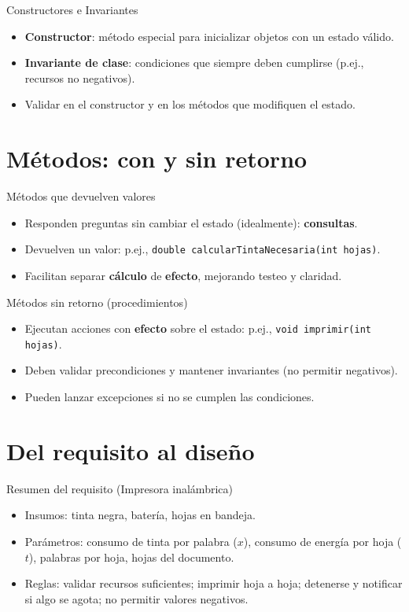\documentclass[aspectratio=169]{beamer}
\begin{document}
\begin{frame}{Constructores e Invariantes}
  \begin{itemize}
    \item \textbf{Constructor}: método especial para inicializar objetos con un estado válido.
    \item \textbf{Invariante de clase}: condiciones que siempre deben cumplirse (p.ej., recursos no negativos).
    \item Validar en el constructor y en los métodos que modifiquen el estado.
  \end{itemize}
\end{frame}

\section{Métodos: con y sin retorno}

\begin{frame}{Métodos que devuelven valores}
  \begin{itemize}
    \item Responden preguntas sin cambiar el estado (idealmente): \textbf{consultas}.
    \item Devuelven un valor: p.ej., \texttt{double calcularTintaNecesaria(int hojas)}.
    \item Facilitan separar \textbf{cálculo} de \textbf{efecto}, mejorando testeo y claridad.
  \end{itemize}
\end{frame}

\begin{frame}{Métodos sin retorno (procedimientos)}
  \begin{itemize}
    \item Ejecutan acciones con \textbf{efecto} sobre el estado: p.ej., \texttt{void imprimir(int hojas)}.
    \item Deben validar precondiciones y mantener invariantes (no permitir negativos).
    \item Pueden lanzar excepciones si no se cumplen las condiciones.
  \end{itemize}
\end{frame}

\section{Del requisito al diseño}

\begin{frame}{Resumen del requisito (Impresora inalámbrica)}
  \begin{itemize}
    \item Insumos: tinta negra, batería, hojas en bandeja.
    \item Parámetros: consumo de tinta por palabra (\(x\)), consumo de energía por hoja (\(t\)), palabras por hoja, hojas del documento.
    \item Reglas: validar recursos suficientes; imprimir hoja a hoja; detenerse y notificar si algo se agota; no permitir valores negativos.
  \end{itemize}
\end{frame}
\end{document}
